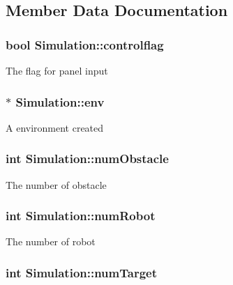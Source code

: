 \subsection{Member Data Documentation}
\hypertarget{classSimulation_a99785aef857b01f3056bada702b53d20}{
\subsubsection[{controlflag}]{\setlength{\rightskip}{0pt plus 5cm}bool Simulation\-::controlflag\hspace{0.3cm}{\ttfamily [private]}}}\label{classSimulation_a99785aef857b01f3056bada702b53d20}
The flag for panel input \hypertarget{classSimulation_adb82ccf6c2a4b78c73987857f5362a35}{
\subsubsection[{env}]{$\ast$ Simulation\-::env\hspace{0.3cm}{\ttfamily [private]}}}\label{classSimulation_adb82ccf6c2a4b78c73987857f5362a35}
A environment created \hypertarget{classSimulation_af3da6bcb913e5ebd863c1e6828576c55}{
\subsubsection[{num\-Obstacle}]{\setlength{\rightskip}{0pt plus 5cm}int Simulation\-::num\-Obstacle\hspace{0.3cm}{\ttfamily [private]}}}\label{classSimulation_af3da6bcb913e5ebd863c1e6828576c55}
The number of obstacle \hypertarget{classSimulation_aed3fe9fceae4a68746206b7a2f9e9d7f}{
\subsubsection[{num\-Robot}]{\setlength{\rightskip}{0pt plus 5cm}int Simulation\-::num\-Robot\hspace{0.3cm}{\ttfamily [private]}}}\label{classSimulation_aed3fe9fceae4a68746206b7a2f9e9d7f}
The number of robot \hypertarget{classSimulation_a70862ad2a43848fa70ad5b15de598e1c}{
\subsubsection[{num\-Target}]{\setlength{\rightskip}{0pt plus 5cm}int Simulation\-::num\-Target\hspace{0.3cm}{\ttfamily [private]}}}\label{classSimulation_a70862ad2a43848fa70ad5b15de598e1c}
